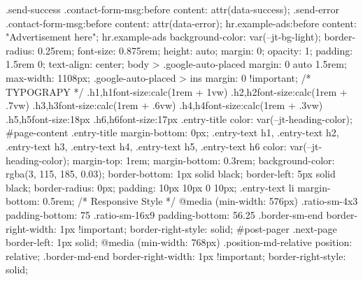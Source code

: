 .send-success .contact-form-msg:before{
content: attr(data-success);
}
.send-error .contact-form-msg:before{
content: attr(data-error);
}
hr.example-ads:before {
content: "Advertisement here";
}
hr.example-ads {
background-color: var(--jt-bg-light);
border-radius: 0.25rem;
font-size: 0.875rem;
height: auto;
margin: 0;
opacity: 1;
padding: 1.5rem 0;
text-align: center;
}
body > .google-auto-placed {
margin: 0 auto 1.5rem;
max-width: 1108px;
}
.google-auto-placed > ins {
margin: 0 !important;
}
/* TYPOGRAPY */
.h1,h1{font-size:calc(1rem + 1vw)}
.h2,h2{font-size:calc(1rem + .7vw)}
.h3,h3{font-size:calc(1rem + .6vw)}
.h4,h4{font-size:calc(1rem + .3vw)}
.h5,h5{font-size:18px}
.h6,h6{font-size:17px}
.entry-title {
color: var(--jt-heading-color);
}
#page-content .entry-title{
margin-bottom: 0px;
}
.entry-text h1,
.entry-text h2,
.entry-text h3,
.entry-text h4,
.entry-text h5,
.entry-text h6 {
color: var(--jt-heading-color);
margin-top: 1rem;
margin-bottom: 0.3rem;
background-color: rgba(3, 115, 185, 0.03);
border-bottom: 1px solid black;
border-left: 5px solid black;
border-radius: 0px;
padding: 10px 10px 0 10px;
}
.entry-text li {
margin-bottom: 0.5rem;
}
/* Responsive Style */
@media (min-width: 576px) {
.ratio-sm-4x3 {
padding-bottom: 75%
}
.ratio-sm-16x9 {
padding-bottom: 56.25%
}
.border-sm-end {
border-right-width: 1px !important;
border-right-style: solid;
}
#post-pager .next-page {
border-left: 1px solid;
}
}
@media (min-width: 768px) {
.position-md-relative {
position: relative;
}
.border-md-end {
border-right-width: 1px !important;
border-right-style: solid;
}
}
